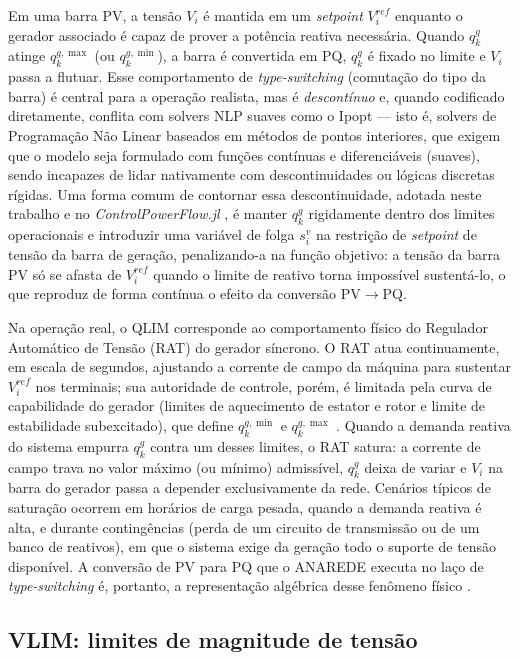 Em uma barra PV, a tensão $V_i$ é mantida em um \textit{setpoint} $V^{ref}_i$ enquanto o gerador associado é capaz de prover a potência reativa necessária. Quando $q^g_k$ atinge $q^{g,\max}_k$ (ou $q^{g,\min}_k$), a barra é convertida em PQ, $q^g_k$ é fixado no limite e $V_i$ passa a flutuar. Esse comportamento de \textit{type-switching} (comutação do tipo da barra) é central para a operação realista, mas é \emph{descontínuo} e, quando codificado diretamente, conflita com solvers NLP suaves como o Ipopt --- isto é, solvers de Programação Não Linear baseados em métodos de pontos interiores, que exigem que o modelo seja formulado com funções contínuas e diferenciáveis (suaves), sendo incapazes de lidar nativamente com descontinuidades ou lógicas discretas rígidas. Uma forma comum de contornar essa descontinuidade, adotada neste trabalho e no \textit{ControlPowerFlow.jl} \cite{chavarry2024}, é manter $q^g_k$ rigidamente dentro dos limites operacionais e introduzir uma variável de folga $s^v_i$ na restrição de \textit{setpoint} de tensão da barra de geração, penalizando-a na função objetivo: a tensão da barra PV só se afasta de $V^{ref}_i$ quando o limite de reativo torna impossível sustentá-lo, o que reproduz de forma contínua o efeito da conversão PV$\rightarrow$PQ.

Na operação real, o QLIM corresponde ao comportamento físico do Regulador Automático de Tensão (RAT) do gerador síncrono. O RAT atua continuamente, em escala de segundos, ajustando a corrente de campo da máquina para sustentar $V^{ref}_i$ nos terminais; sua autoridade de controle, porém, é limitada pela curva de capabilidade do gerador (limites de aquecimento de estator e rotor e limite de estabilidade subexcitado), que define $q^{g,\min}_k$ e $q^{g,\max}_k$ \cite{kundur1994stability}. Quando a demanda reativa do sistema empurra $q^g_k$ contra um desses limites, o RAT satura: a corrente de campo trava no valor máximo (ou mínimo) admissível, $q^g_k$ deixa de variar e $V_i$ na barra do gerador passa a depender exclusivamente da rede. Cenários típicos de saturação ocorrem em horários de carga pesada, quando a demanda reativa é alta, e durante contingências (perda de um circuito de transmissão ou de um banco de reativos), em que o sistema exige da geração todo o suporte de tensão disponível. A conversão de PV para PQ que o ANAREDE executa no laço de \textit{type-switching} é, portanto, a representação algébrica desse fenômeno físico \cite{monticelli1983fluxo}.

\subsection{VLIM: limites de magnitude de tensão}
\label{subsec:vlim}

